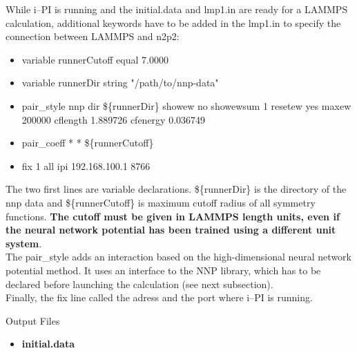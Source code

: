 \documentclass[12pt]{article}
\begin{document}
While i--PI is running and the initial.data and lmp1.in are ready for a LAMMPS calculation, additional keywords have to be added in the lmp1.in to specify the connection between LAMMPS and n2p2:
\begin{itemize}
    \item variable runnerCutoff    equal  7.0000
    \item variable runnerDir       string "/path/to/nnp-data"
    \item pair\_style nnp dir \$\{runnerDir\} showew no showewsum 1 resetew yes maxew 200000 cflength 1.889726 cfenergy 0.036749
    \item pair\_coeff * * \$\{runnerCutoff\}
    \item fix 1 all ipi 192.168.100.1 8766
\end{itemize}
The two first lines are variable declarations. \$\{runnerDir\} is the directory of the nnp data and \$\{runnerCutoff\} is maximum cutoff radius of all symmetry functions. \textbf{The cutoff must be given in LAMMPS length units, even if the neural network potential has been trained using a different unit system}. \\
The pair\_style adds an interaction based on the high-dimensional neural network potential method. It uses an interface to the NNP library, which has to be declared before launching the calculation (see next subsection). \\
Finally, the fix line called the adress and the port where i--PI is running.
\\
\begin{mybox3}{Output Files}
\begin{itemize}
    \item \textbf{initial.data}
\end{itemize}
\end{mybox3}
%
\end{document}
